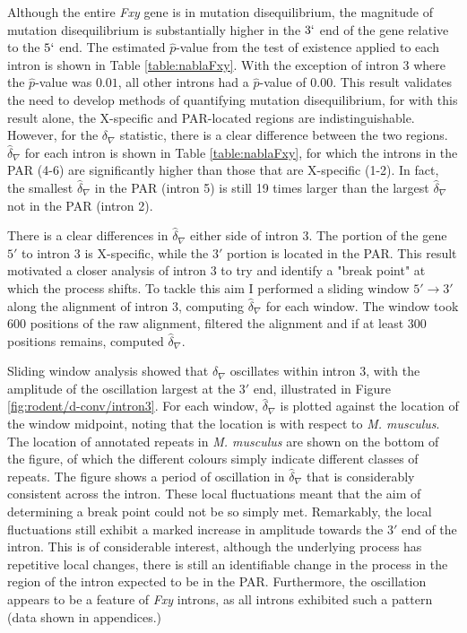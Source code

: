 Although the entire \textit{Fxy} gene is in mutation disequilibrium, the magnitude of mutation disequilibrium is substantially higher in the $3`$ end of the gene relative to the $5`$ end. The estimated $\hat p$-value from the test of existence applied to each intron is shown in Table \ref{table:nablaFxy}. With the exception of intron 3 where the $\hat p$-value was $0.01$, all other introns had a $\hat p$-value of $0.00$. This result validates the need to develop methods of quantifying mutation disequilibrium, for with this result alone, the X-specific and PAR-located regions are indistinguishable. However, for the $\delta_\nabla$ statistic, there is a clear difference between the two regions. $\hat \delta_\nabla$ for each intron is shown in Table \ref{table:nablaFxy}, for which the introns in the PAR (4-6) are significantly higher than those that are X-specific (1-2). In fact, the smallest $\hat \delta_\nabla$ in the PAR (intron 5) is still 19 times larger than the largest $\hat \delta_\nabla$ not in the PAR (intron 2).



There is a clear differences in $\hat \delta_\nabla$ either side of intron 3. The portion of the gene $5'$ to intron 3 is X-specific, while the $3'$ portion is located in the PAR. This result motivated a closer analysis of intron 3 to try and identify a "break point" at which the process shifts. To tackle this aim I performed a sliding window $5' \rightarrow 3'$ along the alignment of intron 3, computing $\hat \delta_\nabla$ for each window. The window took $600$ positions of the raw alignment, filtered the alignment and if at least 300 positions remains, computed $\hat \delta_\nabla$. 

Sliding window analysis showed that $\delta_\nabla$ oscillates within intron 3, with the amplitude of the oscillation largest at the $3'$ end, illustrated in Figure \ref{fig:rodent/d-conv/intron3}. For each window, $\hat \delta_\nabla$ is plotted against the location of the window midpoint, noting that the location is with respect to \textit{M. musculus}. The location of annotated repeats in \textit{M. musculus} are shown on the bottom of the figure, of which the different colours simply indicate different classes of repeats. The figure shows a period of oscillation in $\hat \delta_\nabla$ that is considerably consistent across the intron. These local fluctuations meant that the aim of determining a break point could not be so simply met. Remarkably, the local fluctuations still exhibit a marked increase in amplitude towards the $3'$ end of the intron. This is of considerable interest, although the underlying process has repetitive local changes, there is still an identifiable change in the process in the region of the intron expected to be in the PAR. Furthermore, the oscillation appears to be a feature of \textit{Fxy} introns, as all introns exhibited such a pattern (data shown in appendices.)

